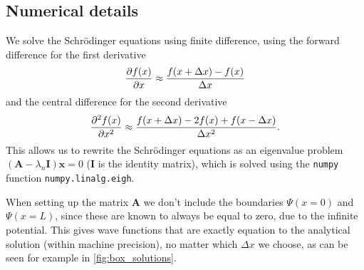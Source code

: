 

\subsection*{Numerical details}
We solve the Schrödinger equations using finite difference, using the forward difference for the first derivative
\begin{equation}
    \pd{f(x)}{x} \approx \frac{f(x + \Delta x) - f(x)}{\Delta x}
\end{equation}
and the central difference for the second derivative
\begin{equation}
    \pd[2]{f(x)}{x} \approx \frac{f(x + \Delta x) - 2f(x) + f(x - \Delta x)}{\Delta x^2}
    .
\end{equation}
This allows us to rewrite the Schrödinger equations as an eigenvalue problem $(\bm A -\lambda_n \bm I) \bm x = 0$ ($\bm I$ is the identity matrix), which is solved using the \texttt{numpy} function \texttt{numpy.linalg.eigh}.

When setting up the matrix $\bm A$ we don't include the boundaries $\Psi(x=0)$ and $\Psi(x=L)$, since these are known to always be equal to zero, due to the infinite potential. This gives wave functions that are exactly equation to the analytical solution (within machine precision), no matter which $\Delta x$ we choose, as can be seen for example in \cref{fig:box_solutions}.